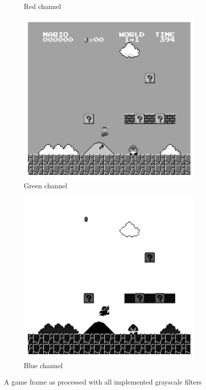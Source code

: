 \begin{figure}[ht]
\begin{subfigure}{.16\textwidth}
        \caption*{Red channel}
    \end{subfigure}
    \hfill
    \begin{subfigure}{.16\textwidth}
        \centering
        \includegraphics*[width=\textwidth]{images/bw_comparison/green_channel.png}
        \caption*{Green channel}
    \end{subfigure}
    \hfill
    \begin{subfigure}{.16\textwidth}
        \centering
        \includegraphics*[width=\textwidth]{images/bw_comparison/blue_channel.png}
        \caption*{Blue channel}
    \end{subfigure}
    \caption{A game frame as processed with all implemented grayscale filters}
\end{figure}

